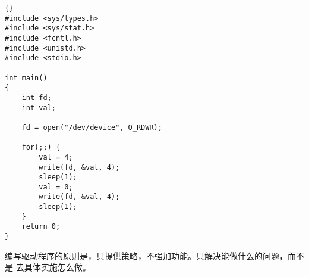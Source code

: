 \documentclass[nofonts]{ctexart}
\begin{document}
\begin{lstlisting}[caption={[清单]control.c},label=control]{}
#include <sys/types.h>
#include <sys/stat.h>
#include <fcntl.h>
#include <unistd.h>
#include <stdio.h>

int main()
{
    int fd;
    int val;

    fd = open("/dev/device", O_RDWR);

    for(;;) {
        val = 4;
        write(fd, &val, 4);
        sleep(1);
        val = 0;
        write(fd, &val, 4);
        sleep(1);
    }
    return 0;
}
\end{lstlisting}

编写驱动程序的原则是，只提供策略，不强加功能。只解决能做什么的问题，而不是
去具体实施怎么做。
\end{document}
